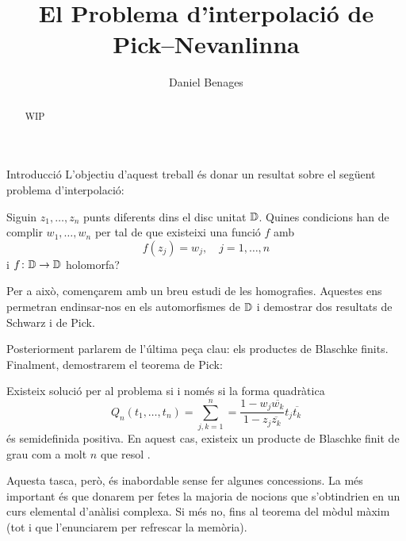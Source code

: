 \documentclass[dvipsnames, svgnames, leqno, a4paper, 12pt]{report}
\title{El Problema d'interpolació de Pick--Nevanlinna}
\date{}
\author{Daniel Benages}
\begin{document}
    \maketitle
    \begin{abstract}
        WIP
    \end{abstract}
    \begin{chapter}{Introducció}
        L'objectiu d'aquest treball és donar un resultat sobre el següent problema d'interpolació:
        \begin{problem}\label{problema}
            Siguin $z_1,\dots,z_n$ punts diferents dins el disc unitat $\mathbb{D}$. Quines condicions han de complir $w_1,\dots,w_n$ per tal de que existeixi una funció $f$ amb\begin{equation}
                f(z_j)=w_j,\quad j=1,\dots,n
            \end{equation}
            i $f\colon\mathbb{D}\to\mathbb{D}$ holomorfa?
        \end{problem}
        Per a això, començarem amb un breu estudi de les homografies. Aquestes ens permetran endinsar-nos en els automorfismes de \(\mathbb{D}\) i demostrar dos resultats de Schwarz i de Pick.

        Posteriorment parlarem de l'última peça clau: els productes de Blaschke finits. Finalment, demostrarem el teorema de Pick:
        \begin{theorem*}[Pick]
            Existeix solució per al problema \normalfont{\ref{problema}} si i només si la forma quadràtica \begin{displaymath}
                Q_n(t_1,\dots,t_n)=\sum_{j,k=1}^n=\frac{1-w_j\overline{w_k}}{1-z_j\overline{z_k}}t_j\overline{t_k}
            \end{displaymath}
            és semidefinida positiva. En aquest cas, existeix un producte de Blaschke finit de grau com a molt $n$ que resol \normalfont{\ref{problema}}.
        \end{theorem*}

        Aquesta tasca, però, és inabordable sense fer algunes concessions. La més important és que donarem per fetes la majoria de nocions que s'obtindrien en un curs elemental d'anàlisi complexa. Si més no, fins al teorema del mòdul màxim (tot i que l'enunciarem per refrescar la memòria).
    \end{chapter}
\end{document}

